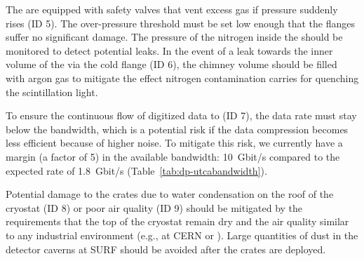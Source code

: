 The  are equipped with safety valves that vent excess gas if pressure suddenly rises (ID 5). The over-pressure threshold must be set low enough that the flanges suffer no significant damage. The pressure of the nitrogen inside the  should be monitored to detect potential leaks. In the event of a leak towards the inner volume of the  via the cold flange (ID 6), the chimney volume should be filled with argon gas to mitigate the effect nitrogen contamination carries for quenching the scintillation light.  

To ensure the continuous flow of digitized data to  (ID 7), the data rate must stay below the  bandwidth, which is a potential risk if the data compression becomes less efficient because of higher noise. To mitigate this risk, we currently have a margin (a factor of \num{5}) in the available bandwidth: \SI{10}{Gbit/s}  compared to the expected rate of \SI{1.8}{Gbit/s} (Table~\ref{tab:dp-utcabandwidth}).

Potential damage to the  crates due to water condensation on the roof of the cryostat (ID 8) or poor air quality (ID 9) should be mitigated by the  requirements that the top of the cryostat remain dry and the air quality similar to any industrial environment (e.g., at CERN or ). Large quantities of dust in the detector caverns at SURF should be avoided after the  crates are deployed.
